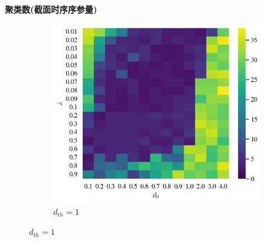\documentclass{article}
\begin{document}
\newpage
\noindent\textbf{聚类数(截面时序序参量)}

\begin{figure}[H]
	\centering
	\begin{subfigure}[b]{0.49\textwidth}
		\includegraphics[width=\textwidth]{./figs/classNum1.png}
		\vspace{-1cm}
		\caption{$d_{th}=1$}
	\end{subfigure}

\end{figure}
\end{document}
